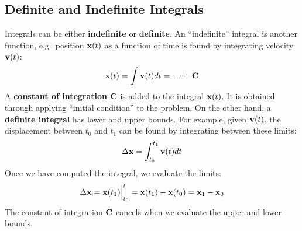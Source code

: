 \documentclass{../../../oss-handout}
\newcommand{\mb}[1]{\ensuremath\mathbf{#1}}
\begin{document}
\subsection{Definite and Indefinite Integrals}
Integrals can be either \textbf{indefinite} or \textbf{definite}. An
``indefinite'' integral is another function, e.g.\ position $\mb{x}(t)$ as a
function of time is found by integrating velocity $\mb{v}(t)$:
\begin{equation*}
  \mb{x}(t)=\int\mb{v}(t)dt=\cdots+\mb{C}
\end{equation*}
A \textbf{constant of integration} $\mb{C}$ is added to the integral
$\mb{x}(t)$. It is obtained through applying ``initial condition'' to the
problem. On the other hand, a \textbf{definite integral} has lower and upper
bounds. For example, given $\mb{v}(t)$, the displacement between $t_0$ and
$t_1$ can be found by integrating between these limits:
\begin{equation*}
  \Delta\mb{x}=\int_{t_0}^{t_1} \mb{v}(t)dt
\end{equation*}
Once we have computed the integral, we evaluate the limits:
\begin{equation*}
  \Delta\mb{x} =
  \mb{x}(t_1)\Big|^t_{t_0}=
  \mb{x}(t_1)-\mb{x}(t_0)=
  \mb{x}_1-\mb{x}_0
\end{equation*}
The constant of integration $\mb{C}$ cancels when we evaluate the upper and
lower bounds.
\end{document}
